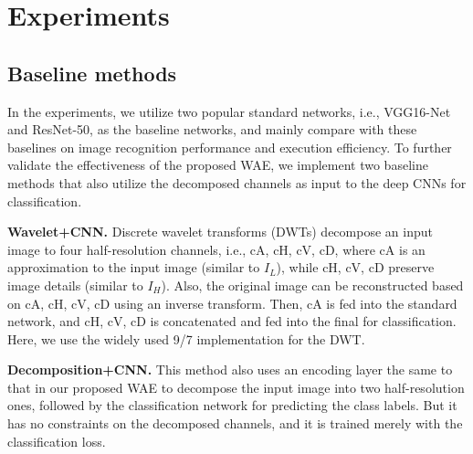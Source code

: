 \documentclass[letterpaper]{article} %
\begin{document}
\section{Experiments}
\subsection{Baseline methods}
In the experiments, we utilize two popular standard networks, i.e., VGG16-Net and ResNet-50, as the baseline networks, and mainly compare with these baselines on image recognition performance and execution efficiency. To further validate the effectiveness of the proposed WAE, we implement two baseline methods that also utilize the decomposed channels as input to the deep CNNs for classification. 

\noindent\textbf{Wavelet+CNN. }Discrete wavelet transforms (DWTs) decompose an input image to four half-resolution channels, i.e., cA, cH, cV, cD, where cA is an approximation to the input image (similar to $I_L$), while cH, cV, cD preserve image details (similar to $I_H$). Also, the original image can be reconstructed based on cA, cH, cV, cD using an inverse transform. Then, cA is fed into the standard network, and cH, cV, cD is concatenated and fed into the final for classification. Here, we use the widely used 9/7 implementation \cite{zhang2011fsim} for the DWT.

\noindent\textbf{Decomposition+CNN. }This method also uses an encoding layer the same to that in our proposed WAE to decompose the input image into two half-resolution ones, followed by the classification network for predicting the class labels. But it has no constraints on the decomposed channels, and it is trained merely with the classification loss.
\end{document}
